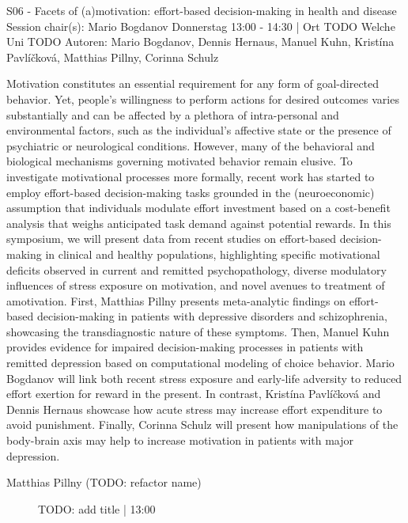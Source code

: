 
            \begin{symposium}
            {S06 - Facets of (a)motivation: effort-based decision-making in health and disease }
            {Session chair(s): Mario Bogdanov}
            {Donnerstag 13:00 - 14:30 | Ort TODO}
            {Welche Uni TODO}
            Autoren: Mario Bogdanov, Dennis Hernaus, Manuel Kuhn, Kristína Pavlíčková, Matthias Pillny, Corinna Schulz

Motivation constitutes an essential requirement for any form of goal-directed behavior. Yet, people’s willingness to perform actions for desired outcomes varies substantially and can be affected by a plethora of intra-personal and environmental factors, such as the individual’s affective state or the presence of psychiatric or neurological conditions. However, many of the behavioral and biological mechanisms governing motivated behavior remain elusive. To investigate motivational processes more formally, recent work has started to employ effort-based decision-making tasks grounded in the (neuroeconomic) assumption that individuals modulate effort investment based on a cost-benefit analysis that weighs anticipated task demand against potential rewards. In this symposium, we will present data from recent studies on effort-based decision-making in clinical and healthy populations, highlighting specific motivational deficits observed in current and remitted psychopathology, diverse modulatory influences of stress exposure on motivation, and novel avenues to treatment of amotivation. First, Matthias Pillny presents meta-analytic findings on effort-based decision-making in patients with depressive disorders and schizophrenia, showcasing the transdiagnostic nature of these symptoms. Then, Manuel Kuhn provides evidence for impaired decision-making processes in patients with remitted depression based on computational modeling of choice behavior. Mario Bogdanov will link both recent stress exposure and early-life adversity to reduced effort exertion for reward in the present. In contrast, Kristína Pavlíčková and Dennis Hernaus showcase how acute stress may increase effort expenditure to avoid punishment. Finally, Corinna Schulz will present how manipulations of the body-brain axis may help to increase motivation in patients with major depression.
            \begin{description}    
            
                \item [Matthias Pillny  (TODO: refactor name)] TODO: add title \textcolor{mygray}{ | 13:00}    
                

\end{description}
\end{symposium}
